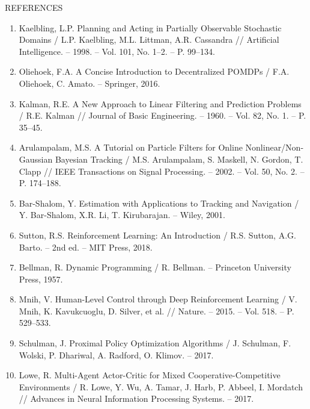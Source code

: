 \documentclass[14pt,a4paper]{extarticle}
\newcommand{\MajorHeadingToc}[1]{%
  \clearpage
  \phantomsection
  \addcontentsline{toc}{section}{#1}
  \begin{center}
    \normalfont\normalsize #1
  \end{center}
  \vspace{1.5\baselineskip}
}
\begin{document}
\MajorHeadingToc{REFERENCES}

\begin{enumerate}[label=\arabic*., leftmargin=1.25cm]
  \item Kaelbling, L.P. Planning and Acting in Partially Observable Stochastic Domains / L.P. Kaelbling, M.L. Littman, A.R. Cassandra // Artificial Intelligence. -- 1998. -- Vol. 101, No. 1--2. -- P. 99--134.

  \item Oliehoek, F.A. A Concise Introduction to Decentralized POMDPs / F.A. Oliehoek, C. Amato. -- Springer, 2016.

  \item Kalman, R.E. A New Approach to Linear Filtering and Prediction Problems / R.E. Kalman // Journal of Basic Engineering. -- 1960. -- Vol. 82, No. 1. -- P. 35--45.

  \item Arulampalam, M.S. A Tutorial on Particle Filters for Online Nonlinear/Non-Gaussian Bayesian Tracking / M.S. Arulampalam, S. Maskell, N. Gordon, T. Clapp // IEEE Transactions on Signal Processing. -- 2002. -- Vol. 50, No. 2. -- P. 174--188.

  \item Bar-Shalom, Y. Estimation with Applications to Tracking and Navigation / Y. Bar-Shalom, X.R. Li, T. Kirubarajan. -- Wiley, 2001.

  \item Sutton, R.S. Reinforcement Learning: An Introduction / R.S. Sutton, A.G. Barto. -- 2nd ed. -- MIT Press, 2018.

  \item Bellman, R. Dynamic Programming / R. Bellman. -- Princeton University Press, 1957.

  \item Mnih, V. Human-Level Control through Deep Reinforcement Learning / V. Mnih, K. Kavukcuoglu, D. Silver, et al. // Nature. -- 2015. -- Vol. 518. -- P. 529--533.

  \item Schulman, J. Proximal Policy Optimization Algorithms / J. Schulman, F. Wolski, P. Dhariwal, A. Radford, O. Klimov. -- 2017.

  \item Lowe, R. Multi-Agent Actor-Critic for Mixed Cooperative-Competitive Environments / R. Lowe, Y. Wu, A. Tamar, J. Harb, P. Abbeel, I. Mordatch // Advances in Neural Information Processing Systems. -- 2017.


\end{enumerate}
\end{document}
